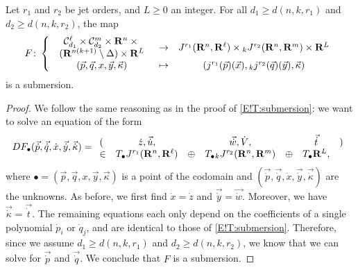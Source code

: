 \begin{corollary}
\label{E!C:submersion}
  Let $r_1$ and $r_2$ be jet orders, and $L \geq 0$ an integer. For all $d_1 \geq d(n, k, r_1)$ and $d_2 \geq d(n, k, r_2)$, the map
  \[
    F \colon \left\{
    \begin{array}{ccc}
      \begin{array}{c}
        \mathcal{C}_{d_1}^\ell \times \mathcal{C}_{d_2}^m \times \mathbf{R}^n \times {} \\
        (\mathbf{R}^{n(k + 1)} \setminus \Delta) \times \mathbf{R}^L
      \end{array}
      & \to
      & J^{r_1}(\mathbf{R}^n, \mathbf{R}^\ell) \times {}_k J^{r_2}(\mathbf{R}^n, \mathbf{R}^m) \times \mathbf{R}^L
    \\
      (\vec{p}, \vec{q}, x, \vec{y}, \vec{\kappa})
      & \mapsto
      & (j^{r_1}(\vec{p})(\vec{x}), {}_k j^{r_2}(\vec{q})(\vec{y}), \vec{\kappa})
    \end{array}
    \right.
  \]
  is a submersion.
\end{corollary}

\begin{proof}
  We follow the same reasoning as in the proof of \cref{E!T:submersion}: we want to solve an equation of the form
  \[
    DF_\bullet (\vec{\dot{p}}, \vec{\dot{q}}, \dot{x}, \vec{\dot{y}}, \vec{\dot{\kappa}}) =
    \begin{array}[tbp]{lcccccl}
      (
      & \dot{z}, \vec{\dot{u}},
      && \vec{\dot{w}}, \dot{V},
      && \vec{\dot{t}}
      & )
    \\
      \in
      & T_\bullet J^{r_1}(\R^n, \R^\ell)
      & \oplus
      & T_\bullet {}_k J^{r_2}(\R^n, \R^m)
      & \oplus
      & T_\bullet \R^L,
    \end{array}
  \]
  where $\mathord{\bullet} = (\vec{p}, \vec{q}, x, \vec{y}, \vec{\kappa})$ is a point of the codomain and $(\vec{\dot{p}}, \vec{\dot{q}}, \dot{x}, \vec{\dot{y}}, \vec{\dot{\kappa}})$ are the unknowns. As before, we first find $\dot{x} = \dot{z}$ and $\vec{\dot{y}} = \vec{\dot{w}}$. Moreover, we have $\vec{\dot{\kappa}} = \vec{\dot{t}}$. The remaining equations each only depend on the coefficients of a single polynomial $\dot{p}_i$ or $\dot{q}_j$, and are identical to those of \cref{E!T:submersion}. Therefore, since we assume $d_1 \geq d(n, k, r_1)$ and $d_2 \geq d(n, k, r_2)$, we know that we can solve for $\vec{\dot{p}}$ and $\vec{\dot{q}}$. We conclude that $F$ is a submersion.
\end{proof}

